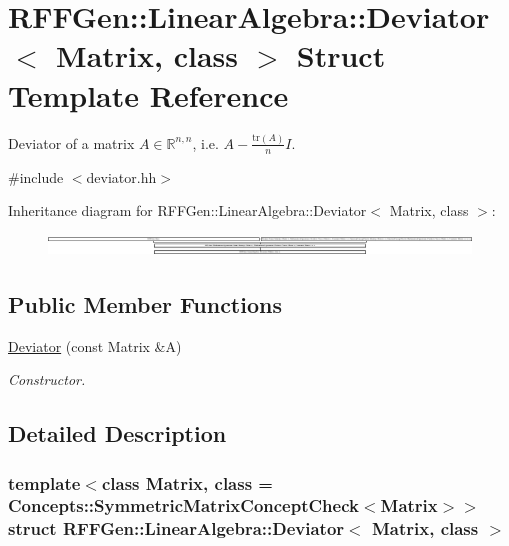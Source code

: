 \hypertarget{structRFFGen_1_1LinearAlgebra_1_1Deviator}{\section{R\-F\-F\-Gen\-:\-:Linear\-Algebra\-:\-:Deviator$<$ Matrix, class $>$ Struct Template Reference}
\label{structRFFGen_1_1LinearAlgebra_1_1Deviator}
}


Deviator of a matrix $ A\in\mathbb{R}^{n,n} $, i.\-e. $ A - \frac{\mathrm{tr}(A)}{n}I $.  




{\ttfamily \#include $<$deviator.\-hh$>$}

Inheritance diagram for R\-F\-F\-Gen\-:\-:Linear\-Algebra\-:\-:Deviator$<$ Matrix, class $>$\-:\begin{figure}[H]
\begin{center}
\leavevmode
\includegraphics[height=0.555556cm]{structRFFGen_1_1LinearAlgebra_1_1Deviator}
\end{center}
\end{figure}
\subsection*{Public Member Functions}
\begin{DoxyCompactItemize}
\item 
\hyperlink{structRFFGen_1_1LinearAlgebra_1_1Deviator_a38235925f7702700d6adcd1265b62b31}{Deviator} (const Matrix \&A)
\begin{DoxyCompactList}\small\item\em Constructor. \end{DoxyCompactList}\end{DoxyCompactItemize}


\subsection{Detailed Description}
\subsubsection*{template$<$class Matrix, class = Concepts\-::\-Symmetric\-Matrix\-Concept\-Check$<$\-Matrix$>$$>$struct R\-F\-F\-Gen\-::\-Linear\-Algebra\-::\-Deviator$<$ Matrix, class $>$}

